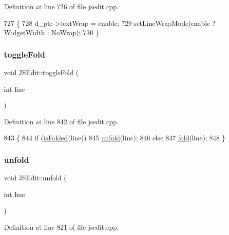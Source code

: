 Definition at line 726 of file jsedit.\+cpp.


\begin{DoxyCode}
727 \{
728     d\_ptr->textWrap = enable;
729     setLineWrapMode(enable ? WidgetWidth : NoWrap);
730 \}
\end{DoxyCode}
\mbox{\label{class_j_s_edit_ae2955b517e15a98c85252efef452ae8a}} 
\subsubsection{\texorpdfstring{toggle\+Fold}{toggleFold}}
{\footnotesize\ttfamily void J\+S\+Edit\+::toggle\+Fold (\begin{DoxyParamCaption}\item[{int}]{line }\end{DoxyParamCaption})\hspace{0.3cm}{\ttfamily [slot]}}



Definition at line 842 of file jsedit.\+cpp.


\begin{DoxyCode}
843 \{
844     \textcolor{keywordflow}{if} (\hyperlink{class_j_s_edit_af06c6789b9046e6b42ec34e94820291b}{isFolded}(line))
845         \hyperlink{class_j_s_edit_a0bdd415108b84306f5c3b86b8e7de0b5}{unfold}(line);
846     \textcolor{keywordflow}{else}
847         \hyperlink{class_j_s_edit_a44ae8482351f716625bfbe42d0a1d5b3}{fold}(line);
848 \}
\end{DoxyCode}
\mbox{\label{class_j_s_edit_a0bdd415108b84306f5c3b86b8e7de0b5}} 
\subsubsection{\texorpdfstring{unfold}{unfold}}
{\footnotesize\ttfamily void J\+S\+Edit\+::unfold (\begin{DoxyParamCaption}\item[{int}]{line }\end{DoxyParamCaption})\hspace{0.3cm}{\ttfamily [slot]}}



Definition at line 821 of file jsedit.\+cpp.


